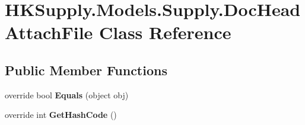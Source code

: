 \hypertarget{class_h_k_supply_1_1_models_1_1_supply_1_1_doc_head_attach_file}{}\section{H\+K\+Supply.\+Models.\+Supply.\+Doc\+Head\+Attach\+File Class Reference}
\label{class_h_k_supply_1_1_models_1_1_supply_1_1_doc_head_attach_file}
\subsection*{Public Member Functions}
\begin{DoxyCompactItemize}
\item 
\mbox{\label{class_h_k_supply_1_1_models_1_1_supply_1_1_doc_head_attach_file_ad54a233b8e7d98541508fd627c8a4914}} 
override bool {\bfseries Equals} (object obj)
\item 
\mbox{\label{class_h_k_supply_1_1_models_1_1_supply_1_1_doc_head_attach_file_a7b48fb6149e02a1b369f1b69815afff1}} 
override int {\bfseries Get\+Hash\+Code} ()
\end{DoxyCompactItemize}
